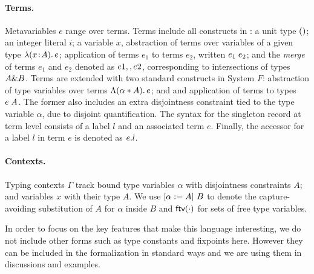 \paragraph{Terms.} 
Metavariables $e$ range over terms.  
Terms include all constructs in \oldname: a unit type $()$; an integer literal $i$;
a variable $x$, abstraction of terms over variables of
a given type $\lambda (x \!:\! A).\, e$; application of terms $e_1$ to terms $e_2$, written
$e_1 \; e_2$; and the \emph{merge} of terms $e_1$ and $e_2 $ denoted as 
$e1 ,, e2$, corresponding to intersections of types $A \& B$.
Terms are extended with two standard constructs in System $F$:
abstraction of type variables over terms $\Lambda (\alpha * A).\, e$; and
and application of terms to types $e \; A$. 
The former also includes an extra disjointness constraint tied to the type 
variable $\alpha$, due to disjoint quantification.
The syntax for the singleton record at term level consists of a label $l$ and
an associated term $e$.
Finally, the accessor for a label $l$ in term $e$ is denoted as $e . l$.

\paragraph{Contexts.} Typing contexts $ \Gamma $ track bound type variables
$\alpha$ with disjointness constraints $A$; and variables $x$ with their type $A$. 
We use $\lbrack \alpha := A \rbrack~ {B}$
to denote the capture-avoiding substitution of $A$ for $\alpha$ inside $B$ and
$\textsf{ftv}(\cdot)$ for sets of free type variables. %

In order to focus on the key features that make this language interesting, we do
not include other forms such as type constants and fixpoints here. 
However they can be included in the formalization in
standard ways and we are using them in discussions and examples. %


